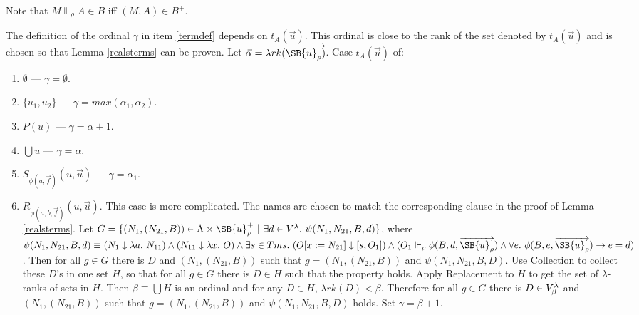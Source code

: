 \documentclass{LMCS}
\newcommand\reals{\ensuremath{\Vdash}}
\newcommand{\lrk}{\ensuremath{\lambda rk}}
\begin{document}
Note that $M \reals_\rho A \in B$ iff $(M, A) \in B^+$.

The definition of the ordinal $\gamma$ in item \ref{termdef} 
depends on $t_A(\vec{u})$. This ordinal is close to the rank of the set denoted
by $t_A(\vec{u})$ and is chosen so that Lemma \ref{realsterms} can be proven.
Let $\vec{\alpha} = \overrightarrow{\lrk(\SB{u}_\rho)}$.
Case $t_A(\vec{u})$ of:
\begin{enumerate}[$\bullet$]
\item $\emptyset$ --- $\gamma = \emptyset$. 
\item $\{ u_1, u_2 \}$ --- $\gamma = max(\alpha_1, \alpha_2)$. 
\item $P(u)$ --- $\gamma = \alpha + 1$.
\item $\bigcup u$ --- $\gamma = \alpha$. 
\item $S_{\phi(a, \vec{f})}(u, \vec{u})$ --- $\gamma = \alpha_1$.
\item $R_{\phi(a, b, \vec{f})}(u, \vec{u})$. This case is more complicated.
The names are chosen to match the corresponding clause in the proof of Lemma \ref{realsterms}. 
Let $G = \{ (N_1, (N_{21}, B)) \in \Lambda \times \SB{u}^+_\rho\ |\
\exists d \in \vl.\ \psi(N_1, N_{21}, B, d) \}$, where
$\psi(N_1, N_{21}, B, d) \equiv (N_1 \downarrow \lambda a.\ N_{11}) \land (N_{11}
\downarrow \lambda x.\ O) \land \exists s \in Tms.\ (O[x:=N_{21}] \downarrow [s, O_1]) \land (O_1 \reals_\rho
\phi(B, d, \overrightarrow{\SB{u}_\rho}) \land \forall e.\ \phi(B, e, \overrightarrow{\SB{u}_\rho}) \to
e = d)$. Then for all $g \in G$ there is $D$ and $(N_1, (N_{21}, B))$ such that $g =
(N_1, (N_{21}, B))$ and $\psi(N_1, N_{21}, B, D)$. Use Collection to collect these $D$'s in one set $H$, so that for
all $g \in G$ there is $D \in H$ such that the property holds. Apply Replacement
to $H$ to get the set of $\lambda$-ranks of sets in $H$. Then $\beta \equiv \bigcup H$ is
an ordinal and for any $D \in H$, $\lrk(D) \lt \beta$. Therefore for all $g \in G$ there is $D \in V^{\lambda}_\beta$ and $(N_1, (N_{21}, B))$ such that $g =
(N_1, (N_{21}, B))$ and $\psi(N_1, N_{21}, B, D)$ holds. Set $\gamma = \beta + 1$.
\end{enumerate}
\end{document}
